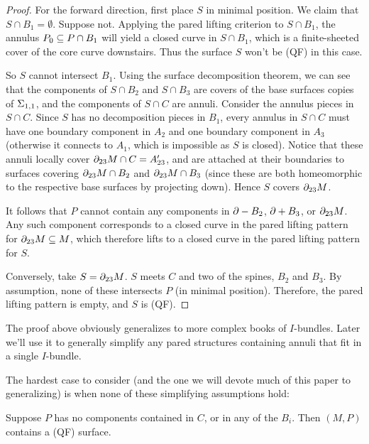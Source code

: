 \begin{proof}

For the forward direction, first place $S$ in minimal position. We claim that
$S\cap B_1=\emptyset$. Suppose not. Applying the pared lifting criterion to
$S\cap B_1$, the annulus $P_0\subseteq P \cap B_1$ will yield a closed curve in
$S\cap B_1$, which is a finite-sheeted cover of the core curve downstairs. Thus
the surface $S$ won't be (QF) in this case.

So $S$ cannot intersect $B_1$. Using the surface decomposition theorem, we can
see that the components of $S \cap B_2$ and $S \cap B_3$ are covers of the base
surfaces copies of $\Sigma_{1,1}$, and the components of $S \cap C$ are annuli.
Consider the annulus pieces in $S \cap C$.  Since $S$ has no decomposition
pieces in $B_1$, every annulus in $S \cap C$ must have one boundary component
in $A_2$ and one boundary component in $A_3$ (otherwise it connects to $A_1$,
which is impossible as $S$ is closed). Notice that these annuli locally cover
$\partial_{23} M \cap C = A_{23}'$, and are attached at their boundaries to surfaces
covering $\partial_{23} M \cap B_2$ and $\partial_{23} M \cap B_3$ (since these are both
homeomorphic to the respective base surfaces by projecting down). Hence $S$
covers $\partial_{23} M$.

It follows that $P$ cannot contain any components in $\partial- B_2$, $\partial+ B_3$, or
$\partial_{23} M$.  Any such component corresponds to a closed curve in the pared
lifting pattern for $\partial_{23} M \subseteq M$, which therefore lifts to a closed
curve in the pared lifting pattern for $S$.

Conversely, take $S=\partial_{23}M$.  $S$ meets $C$ and two of the spines, $B_2$ and
$B_3$.  By assumption, none of these intersects $P$ (in minimal position).
Therefore, the pared lifting pattern is empty, and $S$ is (QF).

\end{proof}

The proof above obviously generalizes to more complex books of $I$-bundles.
Later we'll use it to generally simplify any pared structures containing annuli
that fit in a single $I$-bundle.

The hardest case to consider (and the one we will devote much of this paper to
generalizing) is when none of these simplifying assumptions hold:

\begin{thm}\label{T:ex1}

Suppose $P$ has no components contained in $C$, or in any of the $B_i$. Then
$(M,P)$ contains a (QF) surface.

\end{thm}

